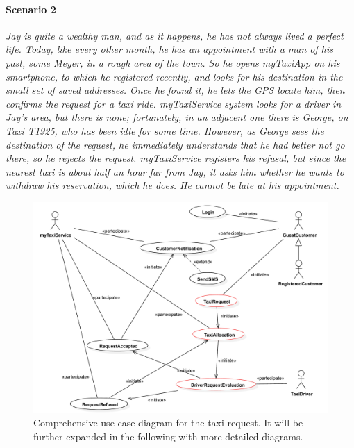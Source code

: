 \paragraph{Scenario 2}{\small\itshape Jay is quite a wealthy man, and as it happens, he has not always lived a perfect life. Today, like every other month, he has an appointment with a man of his past, some Meyer, in a rough area of the town. So he opens myTaxiApp on his smartphone, to which he registered recently, and looks for his destination in the small set of saved addresses. Once he found it, he lets the GPS locate him, then confirms the request for a taxi ride. myTaxiService system looks for a driver in Jay's area, but there is none; fortunately, in an adjacent one there is George, on Taxi T1925, who has been idle for some time. However, as George sees the destination of the request, he immediately understands that he had better not go there, so he rejects the request. myTaxiService registers his refusal, but since the nearest taxi is about half an hour far from Jay, it asks him whether he wants to withdraw his reservation, which he does. He cannot be late at his appointment.}


\begin{figure}
	\includegraphics[width=\textwidth]{img/U_TaxiRequestGLOBAL}
	\caption{Comprehensive use case diagram for the taxi request. It will be further expanded in the following with more detailed diagrams.}
\end{figure}


